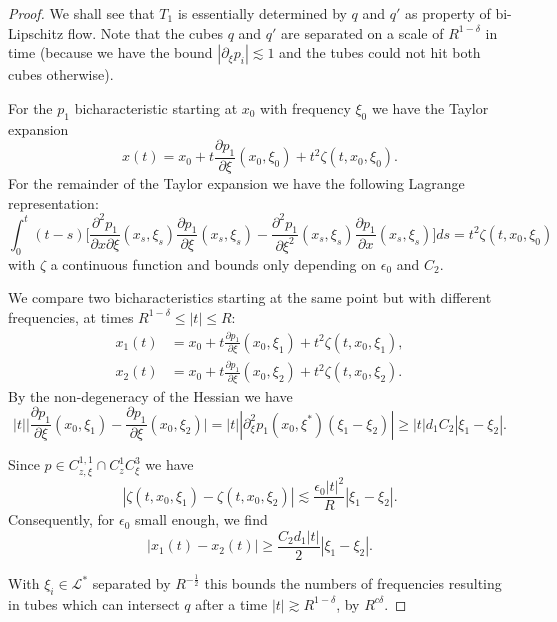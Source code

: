 \documentclass{amsart}
\theoremstyle{definition}
\begin{document}
\begin{proof} 


We shall see that $T_1$ is essentially determined by $q$ and $q'$ as property of bi-Lipschitz flow. 
Note that the cubes $q$ and $q'$ are separated on a scale of $R^{1-\delta}$ in time (because we have the bound $|\partial_{\xi} p_i| \lesssim 1$ and the tubes could not hit both cubes otherwise).

\smallskip

For the $p_1$ bicharacteristic starting at $x_0$ with frequency $\xi_0$ we have the Taylor expansion
\begin{equation*}
x(t) = x_0 + t \frac{\partial p_1}{\partial \xi}(x_0,\xi_0) + t^2 \zeta(t,x_0,\xi_0).
\end{equation*}
For the remainder of the Taylor expansion we have the following Lagrange representation:
\begin{equation*}
\int_0^t (t-s) \big[ \frac{\partial^2 p_1}{\partial x \partial \xi}(x_s,\xi_s) \frac{\partial p_1}{\partial \xi}(x_s,\xi_s) - \frac{\partial^2 p_1}{\partial \xi^2}(x_s,\xi_s) \frac{\partial p_1}{\partial x}(x_s,\xi_s) \big] ds = t^2 \zeta(t,x_0,\xi_0)
\end{equation*}
with $\zeta$ a continuous function and bounds only depending on $ \epsilon_0$ and $C_2$.

We compare two bicharacteristics starting at the same point but with different frequencies, at times $R^{1-\delta} \leq |t| \leq R$:
\begin{equation*}
\begin{split}
x_1(t) &= x_0 + t \frac{\partial p_1 }{\partial \xi}(x_0,\xi_1) + t^2 \zeta(t,x_0,\xi_1), \\
x_2(t) &= x_0 + t \frac{\partial p_1 }{\partial \xi}(x_0,\xi_2) + t^2 \zeta(t,x_0,\xi_2).
\end{split}
\end{equation*}
By the non-degeneracy of the Hessian we have
\begin{equation*}
|t| \big| \frac{\partial p_1}{\partial \xi}(x_0,\xi_1) - \frac{\partial p_1}{\partial \xi}(x_0,\xi_2) \big| = |t| |\partial^2_{\xi} p_1(x_0,\xi^*) (\xi_1 - \xi_2)| \geq |t| d_1 C_2 |\xi_1 - \xi_2|.
\end{equation*}

Since $p \in C^{1,1}_{z,\xi} \cap C^{1}_{z} C^3_{\xi}$ we have
\begin{equation*}
|\zeta(t,x_0,\xi_1) - \zeta(t,x_0,\xi_2) | \lesssim \frac{ \epsilon_0 |t|^2}{R} |\xi_1-\xi_2|.
\end{equation*}
Consequently, for $\epsilon_0$ small enough, we find
\begin{equation*}
|x_1(t) - x_2(t)| \geq \frac{C_2 d_1 |t|}{2} |\xi_1 - \xi_2|.
\end{equation*}

With $\xi_i \in \mathcal{L}^*$ separated by $R^{-\frac{1}{2}}$ this bounds the numbers of frequencies resulting in tubes which can intersect $q$ after a time $|t| \gtrsim R^{1-\delta}$, by $R^{c \delta}$.
\end{proof}
\end{document}

